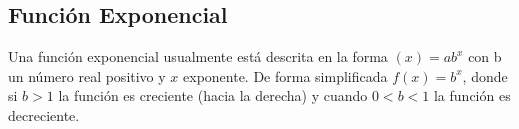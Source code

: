 \subsection{Función Exponencial}
Una función exponencial usualmente está descrita en la forma $(x) = ab^x$ con b un número real positivo y $x$ exponente. De forma simplificada $f(x) = b^x$, donde si $b > 1$ la función es creciente (hacia la derecha) y cuando $0 < b < 1$ la función es decreciente.\\
